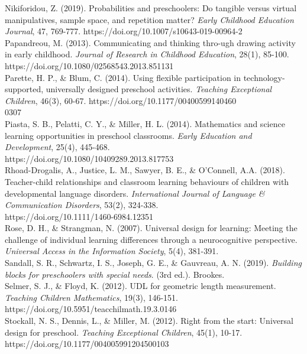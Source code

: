 \documentclass[11.5pt]{sig-alternate}
\begin{document}
Nikiforidou, Z. (2019). Probabilities and preschoolers: Do tangible versus virtual manipulatives, 
sample space, and repetition matter? \textit{Early Childhood Education Journal}, 47, 769-777. https://doi.org/10.1007/s10643-019-00964-2 
\\

Papandreou, M. (2013). Communicating and thinking thro-ugh drawing activity in early 
childhood. \textit{Journal of Research in Childhood Education}, 28(1), 85-100.\\ https://doi.org/10.1080/02568543.2013.851131
\\

Parette, H. P., \& Blum, C. (2014). Using flexible participation in technology-supported, 
universally designed preschool activities. \textit{Teaching Exceptional Children}, 46(3), 60-67. https://doi.org/10.1177/00400599140460\\0307 
\\

Piasta, S. B., Pelatti, C. Y., \& Miller, H. L. (2014). Mathematics and science learning 
opportunities in preschool classrooms. \textit{Early Education and Development}, 25(4), 445-468. \\https://doi.org/10.1080/10409289.2013.817753
\\

Rhoad-Drogalis, A., Justice, L. M., Sawyer, B. E., \& O’Connell, A.A. (2018). Teacher-child 
relationships and classroom learning behaviours of children with developmental language disorders. \textit{International Journal of Language \& Communication Disorders}, 53(2), 324-338. \\https://doi.org/10.1111/1460-6984.12351 
\\

Rose, D. H., \& Strangman, N. (2007). Universal design for learning: Meeting the challenge of
individual learning differences through a neurocognitive perspective. \textit{Universal Access in
the Information Society}, 5(4), 381-391.
\\

Sandall, S. R., Schwartz, I. S., Joseph, G. E., \& Gauvreau, A. N. (2019). \textit{Building 
blocks for preschoolers with special needs}. (3rd ed.). Brookes.
\\

Selmer, S. J., \& Floyd, K. (2012). UDL for geometric length measurement. \textit{Teaching Children 
Mathematics}, 19(3), 146-151. https://doi.org/10.5951/teacchilmath.19.3.0146 
\\
\newpage
Stockall, N. S., Dennis, L., \& Miller, M. (2012). Right from the start: Universal design for 
preschool. \textit{Teaching Exceptional Children}, 45(1), 10-17. \\https://doi.org/10.1177/004005991204500103 
\\
\end{document}
